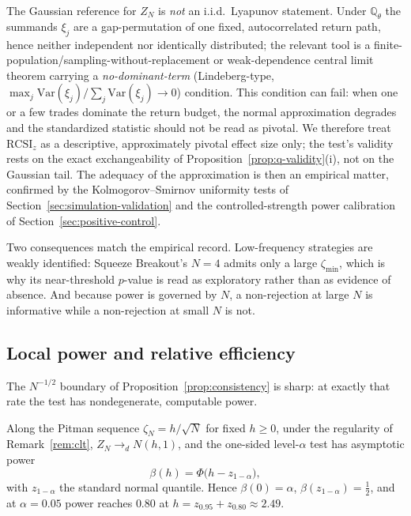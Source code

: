 \begin{remark}
\label{rem:clt}
The Gaussian reference for $Z_N$ is \emph{not} an i.i.d.\ Lyapunov statement.
Under $\mathbb{Q}_\theta$ the summands $\xi_j$ are a gap-permutation of one fixed,
autocorrelated return path, hence neither independent nor identically
distributed; the relevant tool is a finite-population/sampling-without-replacement
or weak-dependence central limit theorem carrying a \emph{no-dominant-term}
(Lindeberg-type, $\max_j\mathrm{Var}(\xi_j)/\sum_j\mathrm{Var}(\xi_j)\to0$)
condition. This condition can fail: when one or a few trades dominate the
return budget, the normal approximation degrades and the standardized statistic
should not be read as pivotal. We therefore treat $\mathrm{RCSI}_z$ as a
descriptive, approximately pivotal effect size only; the test's validity rests on
the exact exchangeability of Proposition~\ref{prop:q-validity}(i), not on the
Gaussian tail. The adequacy of the approximation is then an empirical matter,
confirmed by the Kolmogorov--Smirnov uniformity tests of
Section~\ref{sec:simulation-validation} and the controlled-strength power
calibration of Section~\ref{sec:positive-control}.
\end{remark}

Two consequences match the empirical record. Low-frequency strategies are weakly
identified: Squeeze Breakout's $N=4$ admits only a large $\zeta_{\min}$, which is
why its near-threshold $p$-value is read as exploratory rather than as evidence of
absence. And because power is governed by $N$, a non-rejection at large $N$ is
informative while a non-rejection at small $N$ is not.

\subsection{Local power and relative efficiency}

The $N^{-1/2}$ boundary of Proposition~\ref{prop:consistency} is sharp: at exactly
that rate the test has nondegenerate, computable power.

\begin{proposition}
\label{prop:local-power}
Along the Pitman sequence $\zeta_N=h/\sqrt N$ for fixed $h\ge0$, under the
regularity of Remark~\ref{rem:clt}, $Z_N\to_d N(h,1)$, and the one-sided
level-$\alpha$ test has asymptotic power
\[
\beta(h)=\Phi\big(h-z_{1-\alpha}\big),
\]
with $z_{1-\alpha}$ the standard normal quantile. Hence $\beta(0)=\alpha$,
$\beta(z_{1-\alpha})=\tfrac12$, and at $\alpha=0.05$ power reaches $0.80$ at
$h=z_{0.95}+z_{0.80}\approx2.49$.
\end{proposition}


